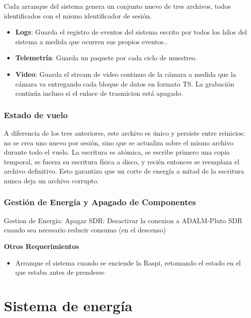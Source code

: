 \documentclass[12pt,a4paper]{article}
\begin{document}
Cada arranque del sistema genera un conjunto nuevo de tres archivos, todos identificados con el mismo identificador de sesión.

\begin{itemize}
\item
  \textbf{Logs}: Guarda el registro de eventos del sistema escrito por todos los hilos del sistema a medida que ocurren sus propios eventos..
\item
  \textbf{Telemetría}: Guarda un paquete por cada ciclo de muestreo.
\item
  \textbf{Video}: Guarda el stream de video continuo de la cámara a medida que la cámara va entregando cada bloque de datos en formato TS. La grabación continúa incluso si el enlace de trasmicion está apagado.
\end{itemize}

\subsubsection*{Estado de vuelo}\label{estado-de-vuelo}

A diferencia de los tres anteriores, este archivo es único y persiste entre reinicios: no se crea uno nuevo por sesión, sino que se actualiza sobre el mismo archivo durante todo el vuelo. La escritura es atómica, se escribe primero una copia temporal, se fuerza su escritura física a disco, y recién entonces se reemplaza el archivo definitivo. Esto garantiza que un corte de energía a mitad de la escritura nunca deja un archivo corrupto.

\subsubsection{Gestión de Energía y Apagado de Componentes}\label{gestiuxf3n-de-energuxeda-y-apagado-de-componentes}

Gestion de Energia: Apagar SDR: Desactivar la conexion a ADALM-Pluto SDR cuando sea necesario reducir consumo (en el descenso)

\textbf{Otros Requerimientos}

\begin{itemize}
\item
  Arranque el sistema cuando se enciende la Raspi, retomando el estado en el que estaba antes de prenderse
\end{itemize}

\section{Sistema de energía}\label{sistema-de-energuxeda}
\end{document}
